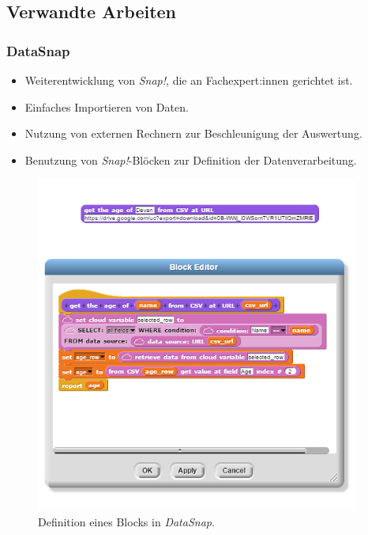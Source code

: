 \subsection{Verwandte Arbeiten}
\begin{frame}
  \frametitle{\currentsectionname}


\end{frame}

\begin{frame}
  \frametitle{DataSnap}

  \begin{minipage}{.6\textwidth}
    \begin{itemize}
      \item Weiterentwicklung von \textit{Snap!}, die an Fachexpert:innen gerichtet ist.
      \item Einfaches Importieren von Daten.
      \item Nutzung von externen Rechnern zur Beschleunigung der Auswertung.
      \item Benutzung von \textit{Snap!}-Blöcken zur Definition der Datenverarbeitung.
    \end{itemize}
  \end{minipage}%
  \begin{minipage}{.4\textwidth}
    \begin{figure}
      \begin{center}
        \includegraphics[width=0.95\textwidth]{assets/datasnap-block-definition.png}
      \end{center}
      \caption{Definition eines Blocks in \textit{DataSnap}. \parencite[26]{hellmannDataSnapEnabling2015}}
    \end{figure}
  \end{minipage}


\end{frame}
